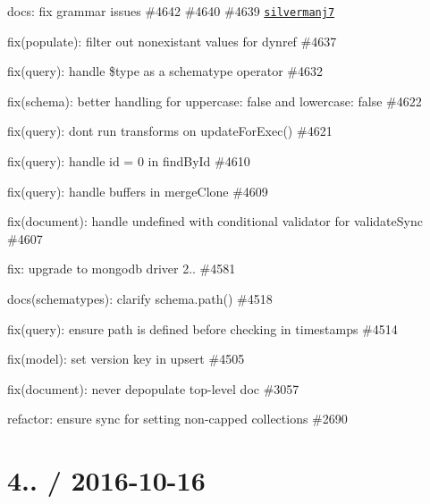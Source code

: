 \begin{DoxyItemize}
\item docs\+: fix grammar issues \#4642 \#4640 \#4639 \href{https://github.com/silvermanj7}{\tt silvermanj7}
\item fix(populate)\+: filter out nonexistant values for dynref \#4637
\item fix(query)\+: handle \$type as a schematype operator \#4632
\item fix(schema)\+: better handling for uppercase\+: false and lowercase\+: false \#4622
\item fix(query)\+: don\textquotesingle{}t run transforms on update\+For\+Exec() \#4621
\item fix(query)\+: handle id = 0 in find\+By\+Id \#4610
\item fix(query)\+: handle buffers in merge\+Clone \#4609
\item fix(document)\+: handle undefined with conditional validator for validate\+Sync \#4607
\item fix\+: upgrade to mongodb driver 2.. \#4581
\item docs(schematypes)\+: clarify schema.\+path() \#4518
\item fix(query)\+: ensure path is defined before checking in timestamps \#4514
\item fix(model)\+: set version key in upsert \#4505
\item fix(document)\+: never depopulate top-\/level doc \#3057
\item refactor\+: ensure sync for setting non-\/capped collections \#2690
\end{DoxyItemize}

\section*{4.. / 2016-\/10-\/16 }


